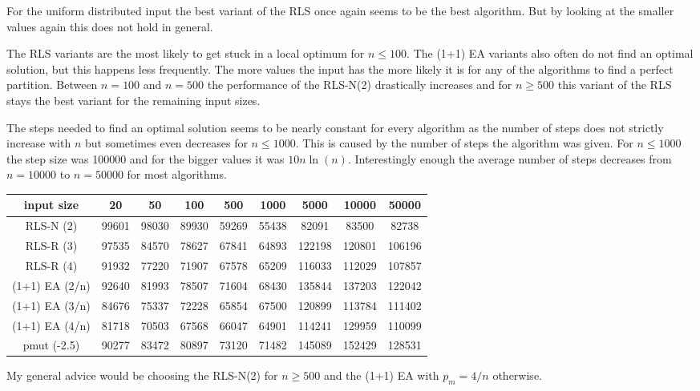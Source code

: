 For the uniform distributed input the best variant of the RLS once again seems to be the best algorithm.
But by looking at the smaller values again this does not hold in general.



The RLS variants are the most likely to get stuck in a local optimum for $n\le100$. The (1+1) EA variants also often do not find an optimal solution, but this happens less frequently. The more values the input has the more likely it is for any of the algorithms to find a perfect partition. Between $n=100$ and $n=500$ the performance of the RLS-N(2) drastically increases and for $n\ge500$ this variant of the RLS stays the best variant for the remaining input sizes.



The steps needed to find an optimal solution seems to be nearly constant for every algorithm as the number of steps does not strictly increase with $n$ but sometimes even decreases for $n\le1000$.
This is caused by the number of steps the algorithm was given.
For $n\le1000$ the step size was 100000 and for the bigger values it was $10n\ln(n)$.
Interestingly enough the average number of steps decreases from $n=10000$ to $n=50000$ for most algorithms.

\begin{tabular}[h]{ccccccccc}
      input size     & 20    & 50    & 100   & 500   & 1000  & 5000   & 10000  & 50000  \\\hline
      RLS-N (2)      & 99601 & 98030 & 89930 & 59269 & 55438 & 82091  & 83500  & 82738  \\
      RLS-R (3)      & 97535 & 84570 & 78627 & 67841 & 64893 & 122198 & 120801 & 106196 \\
      RLS-R (4)      & 91932 & 77220 & 71907 & 67578 & 65209 & 116033 & 112029 & 107857 \\
      (1+1) EA (2/n) & 92640 & 81993 & 78507 & 71604 & 68430 & 135844 & 137203 & 122042 \\
      (1+1) EA (3/n) & 84676 & 75337 & 72228 & 65854 & 67500 & 120899 & 113784 & 111402 \\
      (1+1) EA (4/n) & 81718 & 70503 & 67568 & 66047 & 64901 & 114241 & 129959 & 110099 \\
      pmut (-2.5)    & 90277 & 83472 & 80897 & 73120 & 71482 & 145089 & 152429 & 128531 \\
\end{tabular}



My general advice would be choosing the RLS-N(2) for $n\ge500$ and the (1+1) EA with $p_m=4/n$ otherwise.